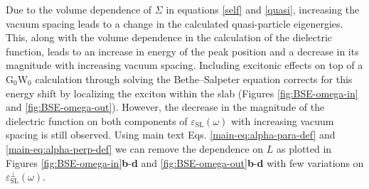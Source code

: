 \documentclass[manuscript=suppinfo,email=true,hyperref=true,keywords=false]{achemso}
\begin{document}
Due to the volume dependence of $\Sigma$ in equations \ref{self} and
\ref{quasi}, increasing the vacuum spacing leads to a change in the
calculated quasi-particle eigenergies. This, along with the volume
dependence in the calculation of the dielectric function, leads to an
increase in energy of the peak position and a decrease in its
magnitude with increasing vacuum spacing.  Including excitonic effects
on top of a G$_0$W$_0$ calculation through solving the Bethe--Salpeter
equation corrects for this energy shift by localizing the exciton
within the slab (Figures \ref{fig:BSE-omega-in} and
\ref{fig:BSE-omega-out}). However, the decrease in the magnitude of
the dielectric function on both components of
$\varepsilon_{\mathrm{SL}}(\omega)$ with increasing vacuum spacing is
still observed.  Using main text Eqs. \ref{main-eq:alpha-para-def} and
\ref{main-eq:alpha-perp-def} we can remove the dependence on $L$ as
plotted in Figures \ref{fig:BSE-omega-in}{\bf b}-{\bf d} and
\ref{fig:BSE-omega-out}{\bf b}-{\bf d} with few variations on
$\varepsilon^{\perp}_{\mathrm{SL}}(\omega)$.
\end{document}

